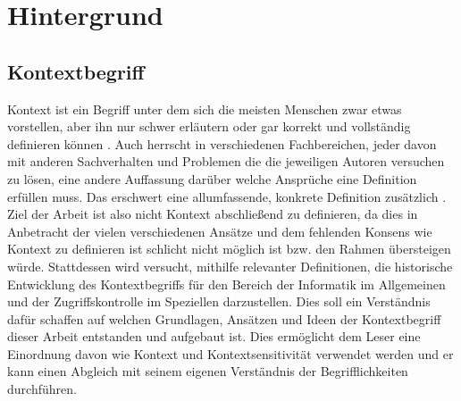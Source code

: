 \chapter{Hintergrund}%
\label{cha:background}


\section{Kontextbegriff}
Kontext ist ein Begriff unter dem sich die meisten Menschen zwar etwas vorstellen, aber ihn nur schwer erläutern oder gar korrekt und vollständig definieren können \cite{dey_understanding_2001}. Auch herrscht in verschiedenen Fachbereichen, jeder davon mit anderen Sachverhalten und Problemen die die jeweiligen Autoren versuchen zu lösen, eine andere Auffassung darüber welche Ansprüche eine Definition erfüllen muss. Das erschwert eine allumfassende, konkrete Definition zusätzlich \cite{hutchison_understanding_2005}. Ziel der Arbeit ist also nicht Kontext abschließend zu definieren, da dies in Anbetracht der vielen verschiedenen Ansätze und dem fehlenden Konsens wie Kontext zu definieren ist \cite{wei_liu_survey_2011,alegre_engineering_2016} schlicht nicht möglich ist bzw. den Rahmen übersteigen würde. Stattdessen wird versucht, mithilfe relevanter Definitionen, die historische Entwicklung des Kontextbegriffs für den Bereich der Informatik im Allgemeinen und der Zugriffskontrolle im Speziellen darzustellen. Dies soll ein Verständnis dafür schaffen auf welchen Grundlagen, Ansätzen und Ideen der Kontextbegriff dieser Arbeit entstanden und aufgebaut ist. Dies ermöglicht dem Leser eine Einordnung davon wie  Kontext und  Kontextsensitivität verwendet werden und er kann einen Abgleich mit seinem eigenen Verständnis der Begrifflichkeiten durchführen.

